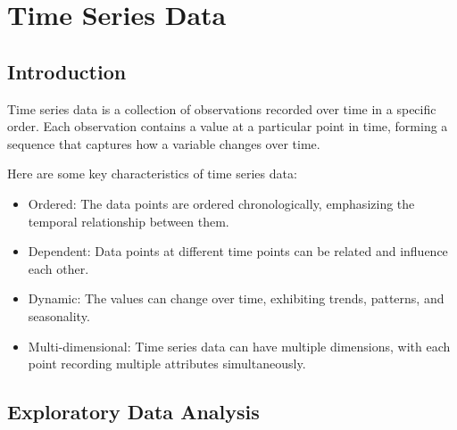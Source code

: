 \chapterspaceabove{6.75cm} %
\chapterspacebelow{7.25cm} %


\chapter{Time Series Data}
    \section{Introduction}
        Time series data is a collection of observations recorded over time in a specific order. Each observation contains a value at a particular point in time, forming a sequence that captures how a variable changes over time.

        Here are some key characteristics of time series data:
        \begin{itemize}
            \item Ordered: The data points are ordered chronologically, emphasizing the temporal relationship between them.
            \item Dependent: Data points at different time points can be related and influence each other.
            \item Dynamic: The values can change over time, exhibiting trends, patterns, and seasonality.
            \item Multi-dimensional: Time series data can have multiple dimensions, with each point recording multiple attributes simultaneously.
        \end{itemize}
    
    \section{Exploratory Data Analysis}
